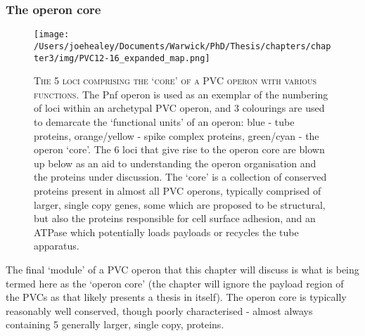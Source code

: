 \clearpage

\subsubsection{The operon core}
\begin{figure}[h!]
\texttt{[image: /Users/joehealey/Documents/Warwick/PhD/Thesis/chapters/chapter3/img/PVC12-16\_expanded\_map.png]}
	\captionsetup{singlelinecheck=off, justification=justified, font=footnotesize, aboveskip=10pt}
	\caption[`Core' protein region of a PVC operon]{\textsc{\normalsize The 5 loci comprising the `core' of a PVC operon with various functions.}\vspace{0.1cm} \newline The Pnf operon is used as an exemplar of the numbering of loci within an archetypal PVC operon, and 3 colourings are used to demarcate the `functional units' of an operon: blue - tube proteins, orange/yellow - spike complex proteins, green/cyan - the operon `core'. The 6 loci that give rise to the operon core are blown up below as an aid to understanding the operon organisation and the proteins under discussion. The `core' is a collection of conserved proteins present in almost all PVC operons, typically comprised of larger, single copy genes, some which are proposed to be structural, but also the proteins responsible for cell surface adhesion, and an ATPase which potentially loads payloads or recycles the tube apparatus.}
	\label{PVC11-16map}
\end{figure}

The final `module' of a PVC operon that this chapter will discuss is what is being termed here as the `operon core' (the chapter will ignore the payload region of the PVCs as that likely presents a thesis in itself). The operon core is typically reasonably well conserved, though poorly characterised - almost always containing 5 generally larger, single copy, proteins. 


